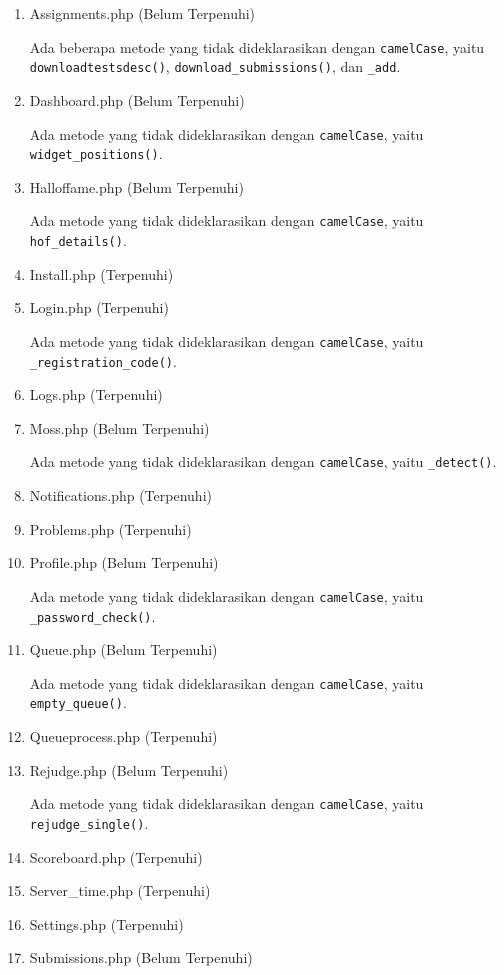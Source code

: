 \begin{enumerate}
	\item Assignments.php (Belum Terpenuhi)
	
	Ada beberapa metode yang tidak dideklarasikan dengan \texttt{camelCase}, yaitu \verb|downloadtestsdesc()|,  \verb|download_submissions()|, dan \verb|_add|.
	
	\item Dashboard.php (Belum Terpenuhi)
	
	Ada metode yang tidak dideklarasikan dengan \texttt{camelCase}, yaitu \verb|widget_positions()|.
	
	\item Halloffame.php (Belum Terpenuhi)
	
	Ada metode yang tidak dideklarasikan dengan \texttt{camelCase}, yaitu \verb|hof_details()|.
	
	\item Install.php (Terpenuhi)
	\item Login.php (Terpenuhi)
	
	Ada metode yang tidak dideklarasikan dengan \texttt{camelCase}, yaitu \verb|_registration_code()|.
	
	\item Logs.php (Terpenuhi)
	\item Moss.php (Belum Terpenuhi)
	
	Ada metode yang tidak dideklarasikan dengan \texttt{camelCase}, yaitu \verb|_detect()|.
	
	\item Notifications.php (Terpenuhi)
	\item Problems.php (Terpenuhi)
	\item Profile.php (Belum Terpenuhi)
	
	Ada metode yang tidak dideklarasikan dengan \texttt{camelCase}, yaitu \verb|_password_check()|.
	
	\item Queue.php (Belum Terpenuhi)
	
	Ada metode yang tidak dideklarasikan dengan \texttt{camelCase}, yaitu \verb|empty_queue()|.
	
	\item Queueprocess.php (Terpenuhi)
	\item Rejudge.php (Belum Terpenuhi)
	
	Ada metode yang tidak dideklarasikan dengan \texttt{camelCase}, yaitu \verb|rejudge_single()|.
	
	\item Scoreboard.php (Terpenuhi)
	\item Server\_time.php (Terpenuhi)
	\item Settings.php (Terpenuhi)
	\item Submissions.php (Belum Terpenuhi)
	

\end{enumerate}
